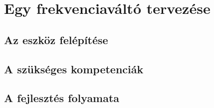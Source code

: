 \chapter{Egy frekvenciaváltó tervezése}
\section{Az eszköz felépítése}



\section{A szükséges kompetenciák}
\section{A fejlesztés folyamata}
